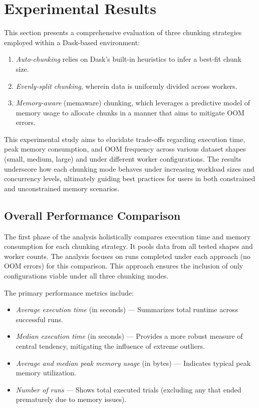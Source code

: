 \section{Experimental Results}
\label{sec:idp-experimental-results}

This section presents a comprehensive evaluation of three chunking strategies employed within a Dask-based environment:
\begin{enumerate}
    \item \emph{Auto-chunking} relies on Dask's built-in heuristics to infer a best-fit chunk size.
    \item \emph{Evenly-split chunking}, wherein data is uniformly divided across workers.
    \item \emph{Memory-aware} (memaware) chunking, which leverages a predictive model of memory usage to allocate chunks in a manner that aims to mitigate \ac{OOM} errors.
\end{enumerate}
This experimental study aims to elucidate trade-offs regarding execution time, peak memory consumption, and \ac{OOM} frequency across various dataset shapes (small, medium, large) and under different worker configurations.
The results underscore how each chunking mode behaves under increasing workload sizes and concurrency levels, ultimately guiding best practices for users in both constrained and unconstrained memory scenarios.

\subsection{Overall Performance Comparison}
\label{subsec:overall-performance}

The first phase of the analysis holistically compares execution time and memory consumption for each chunking strategy.
It pools data from all tested shapes and worker counts.
The analysis focuses on runs completed under each approach (\ie no \ac{OOM} errors) for this comparison.
This approach ensures the inclusion of only configurations viable under all three chunking modes.

The primary performance metrics include:

\begin{itemize}
    \item \emph{Average execution time} (in seconds) --- Summarizes total runtime across successful runs.
    \item \emph{Median execution time} (in seconds) --- Provides a more robust measure of central tendency, mitigating the influence of extreme outliers.
    \item \emph{Average and median peak memory usage} (in bytes) --- Indicates typical peak memory utilization.
    \item \emph{Number of runs} --- Shows total executed trials (excluding any that ended prematurely due to memory issues).
\end{itemize}

